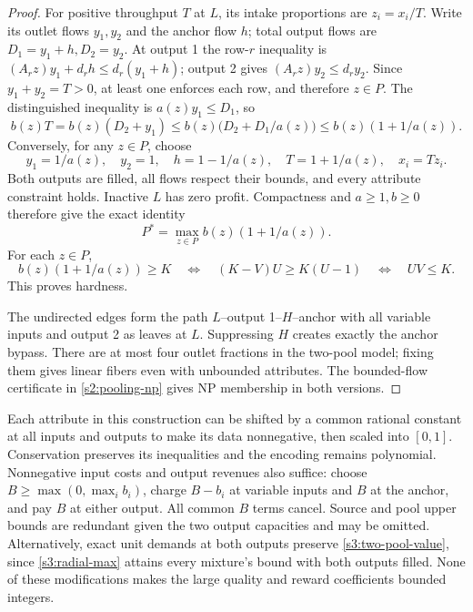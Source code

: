 \begin{proof}
For positive throughput $T$ at $L$, its intake proportions are $z_i=x_i/T$.
Write its outlet flows $y_1,y_2$ and the anchor flow $h$; total output
flows are $D_1=y_1+h,D_2=y_2$. At output 1 the row-$r$ inequality is
$(A_rz)y_1+d_rh\le d_r(y_1+h)$; output 2 gives
$(A_rz)y_2\le d_ry_2$. Since $y_1+y_2=T>0$, at least one enforces
each row, and therefore $z\in P$. The distinguished inequality is
$a(z)y_1\le D_1$, so
\[
 b(z)T=b(z)(D_2+y_1)
 \le b(z)\bigl(D_2+D_1/a(z)\bigr)
 \le b(z)(1+1/a(z)).
\]
Conversely, for any $z\in P$, choose
\begin{equation}
 y_1=1/a(z),\quad y_2=1,\quad h=1-1/a(z),\quad
 T=1+1/a(z),\quad x_i=Tz_i.\label{s3:radial-max}
\end{equation}
Both outputs are filled, all flows respect their bounds, and every
attribute constraint holds. Inactive $L$ has zero profit. Compactness
and $a\ge1,b\ge0$ therefore give the exact identity
\begin{equation}
 P^*=\max_{z\in P}b(z)(1+1/a(z)).\label{s3:two-pool-value}
\end{equation}
For each $z\in P$,
\begin{equation}
 b(z)(1+1/a(z))\ge K
 \quad\Longleftrightarrow\quad
 (K-V)U\ge K(U-1)
 \quad\Longleftrightarrow\quad UV\le K.\label{s3:threshold-product}
\end{equation}
This proves hardness.

The undirected edges form the path
$L$--output 1--$H$--anchor with all variable inputs and output 2 as
leaves at $L$. Suppressing $H$ creates exactly the anchor bypass.
There are at most four outlet fractions in the two-pool model; fixing
them gives linear fibers even with unbounded attributes. The bounded-flow
certificate in \cref{s2:pooling-np} gives NP membership in both versions.
\end{proof}

Each attribute in this construction can be shifted by a common rational
constant at all inputs and outputs to make its data nonnegative, then
scaled into $[0,1]$. Conservation preserves its inequalities and the
encoding remains polynomial. Nonnegative input costs and output revenues
also suffice: choose $B\ge\max(0,\max_i b_i)$, charge $B-b_i$ at
variable inputs and $B$ at the anchor, and pay $B$ at either output.
All common $B$ terms cancel. Source and pool upper bounds are redundant
given the two output capacities and may be omitted. Alternatively, exact
unit demands at both outputs preserve \eqref{s3:two-pool-value}, since
\eqref{s3:radial-max} attains every mixture's bound with both outputs
filled. None of these modifications makes the large quality and reward
coefficients bounded integers.


